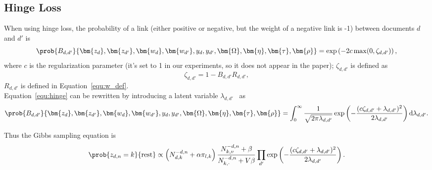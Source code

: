 \subsection{Hinge Loss}
\label{subsec:hinge_topic}

When using hinge loss, the probability of a link (either positive or negative, but the weight of a negative link is -1) between documents $d$ and $d'$ is
\begin{equation}\label{equ:hinge}
\prob {B_{d,d'}} {\bm{z_d}, \bm{z_{d'}}, \bm{w_d}, \bm{w_{d'}}, y_d, y_{d'}, \bm{\Omega}, \bm{\eta}, \bm{\tau}, \bm{\rho}} = \exp \left( -2c \max (0, \zeta_{d,d'}) \right),
\end{equation}
where $c$ is the regularization parameter (it's set to 1 in our experiments, so it does not appear in the paper); $\zeta_{d,d'}$ is defined as
\begin{equation}
\zeta_{d,d'} = 1 - B_{d,d'} R_{d,d'},
\end{equation}
$R_{d,d'}$ is defined in Equation~\ref{equ:w_def}.\\

Equation~\ref{equ:hinge} can be rewritten by introducing a latent variable $\lambda_{d,d'}$~\cite{polson-2011-data} as
\begin{equation}
\prob {B_{d,d'}} {\bm{z_d}, \bm{z_{d'}}, \bm{w_d}, \bm{w_{d'}}, y_d, y_{d'}, \bm{\Omega}, \bm{\eta}, \bm{\tau}, \bm{\rho}} = \int_{0}^{\infty} \frac {1} {\sqrt{2\pi \lambda_{d,d'}}} \exp \left( -\frac {(c\zeta_{d,d'}+\lambda_{d,d'})^2} {2\lambda_{d,d'}} \right) \mathrm{d} \lambda_{d,d'}.
\end{equation}

Thus the Gibbs sampling equation is
\begin{equation}\label{eq:hinge_topic}
\prob {z_{d,n}=k} {\mathrm{rest}} \propto \left( N_{d,k}^{-d,n} + \alpha \pi_{l,k} \right) \frac {N_{k,v}^{-d,n}+\beta} {N_{k,\cdot}^{-d,n}+V\beta} \prod_{d'} \exp \left( -\frac {(c\zeta_{d,d'}+\lambda_{d,d'})^2} {2\lambda_{d,d'}} \right).
\end{equation}

